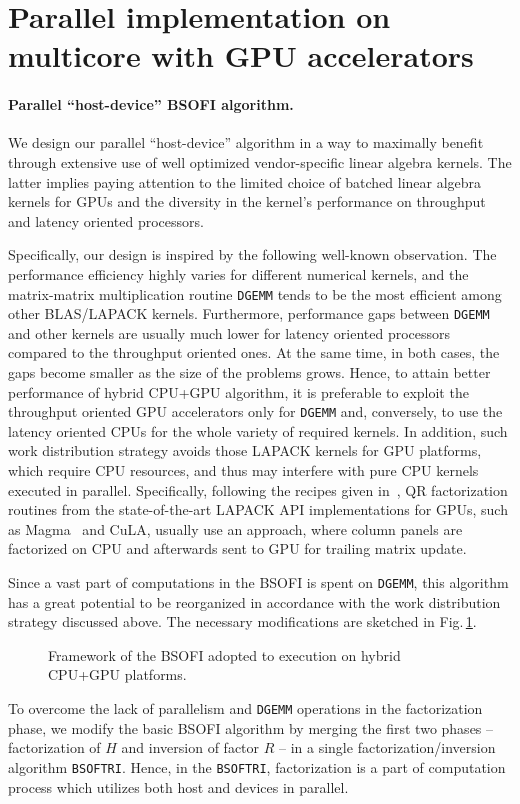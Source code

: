 \documentclass{llncs}
\newcommand{\Lapack}{{\sc LAPACK}\xspace}
\newcommand{\Magma}{{\sc Magma}\xspace}
\newcommand{\Cula}{{\sc CuLA}\xspace}
\newcommand{\Bsoftri}{\texttt{BSOFTRI}\xspace}
\newcommand{\Gemm}{\texttt{DGEMM}\xspace}
\begin{document}
\section{Parallel implementation on multicore with GPU accelerators}
\label{sec:implementation_on_CPU+GPU}

\paragraph%
{Parallel ``host-device'' BSOFI algorithm.}\label{sec:alrorithms_for_accelerators}

We design our parallel ``host-device'' algorithm in a way to maximally benefit 
through extensive use of well optimized vendor-specific 
linear algebra kernels.
The latter implies paying attention to 
the limited choice of batched linear algebra kernels for GPUs
and the diversity in the kernel's performance on throughput and latency oriented processors.

Specifically, our design is inspired by the following well-known observation.
The performance efficiency
highly varies for different numerical kernels, 
and the matrix-matrix multiplication routine \Gemm
tends to be the most efficient among other BLAS/\Lapack kernels. 
Furthermore, performance gaps between \Gemm and other kernels
are usually much lower for 
latency oriented processors compared to the throughput oriented ones.
At the same time, in both cases, the gaps become smaller 
as the size of the problems grows.
Hence, 
to attain better performance of hybrid CPU+GPU algorithm, 
it is preferable to exploit 
the throughput oriented GPU accelerators only for \Gemm
and, conversely, 
to use the latency oriented CPUs for the whole variety of required kernels.
In addition, such work distribution strategy
avoids those \Lapack kernels for GPU platforms,
which require CPU resources, 
and thus may 
interfere with pure CPU kernels
executed in parallel.
Specifically, %
following the recipes given in~\cite{Volkov08LU_QR_Cholesky},
QR factorization routines 
from the state-of-the-art \Lapack API implementations for GPUs,
such as \Magma~\cite{Tomov10Magma} and
\Cula,
usually use an approach, 
where column panels are factorized on CPU 
and afterwards sent to GPU for trailing matrix update.

Since 
a vast part of computations in the BSOFI is spent on \Gemm,
this algorithm has a great potential to be reorganized 
in accordance with the work distribution strategy discussed above.
The necessary modifications are sketched in Fig.\,\ref{fig:BSOFI_HostDevice}. 
\begin{figure}[t]%
  \scalebox{0.75}{
    
  }
  \caption{Framework of the BSOFI
    adopted to execution on hybrid CPU+GPU platforms.%
    \label{fig:BSOFI_HostDevice}}
\end{figure}
To overcome the lack of parallelism and \Gemm operations 
in the factorization phase,
we modify the basic BSOFI algorithm 
by merging the first two phases -- 
factorization of $H$ and inversion of factor $R$ -- 
in a single factorization/inversion algorithm \Bsoftri. 
Hence, in the \Bsoftri,
factorization is a part of computation process which
utilizes both host and devices in parallel.
\end{document}
